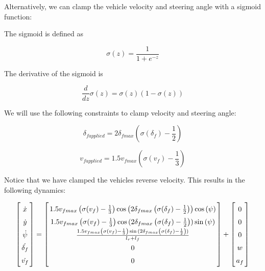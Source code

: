 \documentclass{article}
\theoremstyle{remark}
\theoremstyle{definition}
\begin{document}
Alternatively, we can clamp the vehicle velocity and steering angle with a sigmoid function:

The sigmoid is defined as

$$ \sigma(z) = \frac 1 {1+e^{-z}} $$

The derivative of the sigmoid is

$$ \frac d {dz} \sigma(z) = \sigma(z)(1 - \sigma(z))$$

We will use the following constraints to clamp velocity and steering angle:

$$ \delta_{fapplied} = 2\delta_{fmax}  \left ( \sigma(\delta_f) - \frac 1 2 \right )  $$

$$ v_{fapplied} = 1.5v_{fmax}  \left ( \sigma(v_f) - \frac 1 3 \right )  $$

Notice that we have clamped the vehicles reverse velocity. This results in the following dynamics:

$$ \left \lbrack \arraycolsep=1.4pt\def\arraystretch{1.5} \begin{array}{c}
    \dot{x} \\
    \dot{y} \\
    \dot{\psi} \\
    \dot{\delta_f} \\
    \dot{v_f}
\end{array} \right \rbrack  = \left \lbrack \arraycolsep=1.4pt\def\arraystretch{1.5} \begin{array}{c}
    1.5v_{fmax}  \left ( \sigma(v_f) - \frac 1 3 \right ) \cos {\left ( 2\delta_{fmax}  \left ( \sigma(\delta_f) - \frac 1 2 \right ) \right) } \cos{( \psi )} \\
    1.5v_{fmax}  \left ( \sigma(v_f) - \frac 1 3 \right ) \cos {( 2\delta_{fmax}  \left ( \sigma(\delta_f) - \frac 1 2 \right ) ) } \sin{( \psi )} \\
    \frac { 1.5v_{fmax}  \left ( \sigma(v_f) - \frac 1 3 \right ) \sin {( 2\delta_{fmax}  \left ( \sigma(\delta_f) - \frac 1 2 \right ) ) }} {l_r + l_f} \\
    0 \\
    0
\end{array} \right \rbrack + \left \lbrack \arraycolsep=1.4pt\def\arraystretch{1.5} \begin{array}{c}
    0 \\
    0 \\
    0 \\
    w \\
    a_f
\end{array} \right \rbrack $$
\end{document}
